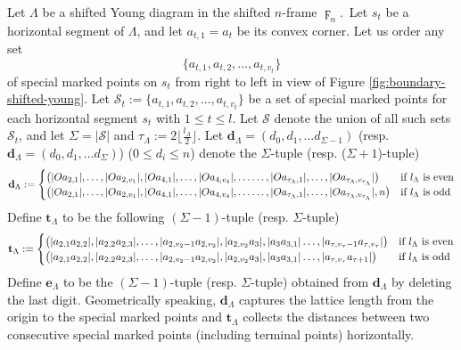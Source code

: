 \documentclass[a4paper]{amsart}
\theoremstyle{plain}
\theoremstyle{definition}
\numberwithin{equation}{section}
\begin{document}
\subsubsection{ }   	Let $\Lambda$ be a shifted Young diagram in the shifted $n$-frame $ \digamma_{n}$.\ Let $s_t$ be a horizontal segment of $\Lambda$, and let $a_{t,1} =a_t$ be its convex corner. Let us order any set
\begin{equation*}
    \{a_{t,1}, a_{t,2}, \ldots, a_{t,v_t}\}
\end{equation*}
of special marked points on $s_t$ from right to left in view of Figure  \ref{fig:boundary-shifted-young}. Let $\mathcal{S}_t := \{a_{t,1}, a_{t,2}, \ldots, a_{t,v_t}\}$ be a set of special marked points for each horizontal segment $s_t$ with $1 \leq t \leq l$. Let $\mathcal{S} $ denote the union of all such sets $\mathcal{S}_t$, and let $\Sigma = |\mathcal{S}|$ and $\tau_\Lambda:= 2\lfloor\frac{l_\Lambda}{2} \rfloor$. Let
$\mathbf{{d}}_{\Lambda} = (d_0, d_1, \ldots d_{\Sigma-1})$ (resp. $\mathbf{{d}}_{\Lambda} = (d_0, d_1, \ldots d_\Sigma)$) ($0 \leq d_i \leq n$) denote the $\Sigma$-tuple (resp. ($\Sigma+1$)-tuple)
\[
    \mathbf{d}_\Lambda:= \begin{cases}
        \big(|Oa_{2,1}|,\ldots, |Oa_{2,v_1}|,|Oa_{4,1}|,\ldots, |Oa_{4,v_4}|, \ldots \ldots,|Oa_{\tau_\Lambda,1}|,\ldots, |Oa_{\tau_\Lambda,v_{\tau_\Lambda}}| \big)    & \textnormal{if $l_\Lambda$ is even} \\
        \big(|Oa_{2,1}|,\ldots, |Oa_{2,v_1}|,|Oa_{4,1}|,\ldots, |Oa_{4,v_4}|, \ldots \ldots,|Oa_{\tau_\Lambda,1}|,\ldots, |Oa_{\tau_\Lambda,v_{\tau_\Lambda}}|, n \big) & \textnormal{if $l_\Lambda$ is odd}
    \end{cases} \]
Define $\mathbf{t}_{\Lambda}$ to be the following $(\Sigma-1)$-tuple (resp. $\Sigma$-tuple)
\[
    \mathbf{t}_{\Lambda}:= \begin{cases}
        \big(|a_{2,1}a_{2,2}|, |a_{2,2}a_{2,3}|, \ldots, |a_{2,v_{2}-1}a_{2,v_2}|, |a_{2,v_2}a_{3}|,|a_3a_{3,1}| \ldots, |a_{\tau,v_{\tau}-1}a_{\tau,v_\tau}|\big) & \textnormal{if $l_\Lambda$ is even} \\
        \big(|a_{2,1}a_{2,2}|, |a_{2,2}a_{2,3}|, \ldots, |a_{2,v_{2}-1}a_{2,v_2}|, |a_{2,v_2}a_{3}|,|a_3a_{3,1}| \ldots, |a_{\tau,v_{\tau}}a_{\tau+1}|\big)     & \textnormal{if $l_\Lambda$ is odd}
    \end{cases} \]
Define $\mathbf{e}_{\Lambda}$ to be the $(\Sigma-1)$-tuple (resp. $\Sigma$-tuple) obtained from $\mathbf{d}_\Lambda$ by deleting the last digit.  Geometrically speaking, $\mathbf{{d}}_{\Lambda}$ captures the lattice length from the origin to the special marked points and $\mathbf{t}_{\Lambda}$ collects the distances between two consecutive special marked points (including terminal points) horizontally.
\end{document}
